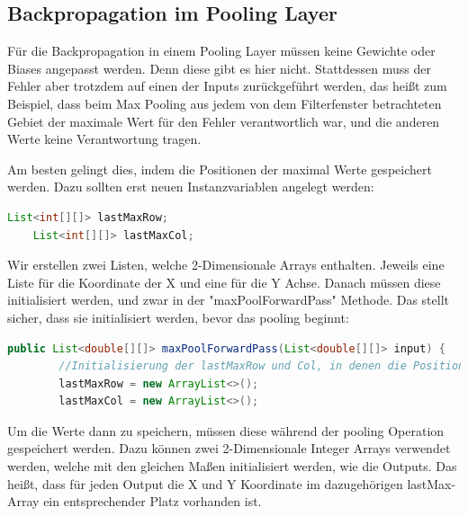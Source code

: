 \documentclass[12pt]{article}
\begin{document}
\subsection{Backpropagation im Pooling Layer}
Für die Backpropagation in einem Pooling Layer müssen keine Gewichte oder Biases angepasst werden. Denn diese gibt es hier nicht. Stattdessen muss der Fehler aber trotzdem auf einen der Inputs zurückgeführt werden, das heißt zum Beispiel, dass beim Max Pooling aus jedem von dem Filterfenster betrachteten Gebiet der maximale Wert für den Fehler verantwortlich war, und die anderen Werte keine Verantwortung tragen. 


Am besten gelingt dies, indem die Positionen der maximal Werte gespeichert werden.
Dazu sollten erst neuen Instanzvariablen angelegt werden:


\begin{lstlisting}[language=Java]
    List<int[][]> lastMaxRow;
    List<int[][]> lastMaxCol; 
\end{lstlisting}

Wir erstellen zwei Listen, welche 2-Dimensionale Arrays enthalten. Jeweils eine Liste für die Koordinate der X und eine für die Y Achse.
Danach müssen diese initialisiert werden, und zwar in der "maxPoolForwardPass" Methode. Das stellt sicher, dass sie initialisiert werden, bevor das pooling beginnt:

\begin{lstlisting}[language=Java]
    public List<double[][]> maxPoolForwardPass(List<double[][]> input) {
        //Initialisierung der lastMaxRow und Col, in denen die Position der Maximalen Werte gespeichert werden
        lastMaxRow = new ArrayList<>();
        lastMaxCol = new ArrayList<>();
\end{lstlisting}

Um die Werte dann zu speichern, müssen diese während der pooling Operation gespeichert werden.
Dazu können zwei 2-Dimensionale Integer Arrays verwendet werden, welche mit den gleichen Maßen initialisiert werden, wie die Outputs. Das heißt, dass für jeden Output die X und Y Koordinate im dazugehörigen lastMax-Array ein entsprechender Platz vorhanden ist.
\end{document}

